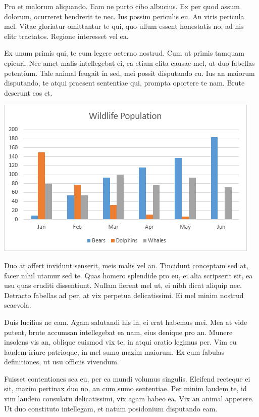 \documentclass[12pt,a4paper,twocolumn]{article}
\begin{document}
    Pro et malorum aliquando. Eam ne purto cibo albucius. Ex per quod assum dolorum, ocurreret hendrerit te nec. Ius possim periculis eu. An viris pericula mel. Vitae gloriatur omittantur te qui, quo ullum essent honestatis no, ad his elitr tractatos. Regione interesset vel ea.
    
    Ex unum primis qui, te eum legere aeterno nostrud. Cum ut primis tamquam epicuri. Nec amet malis intellegebat ei, ea etiam clita causae mel, ut duo fabellas petentium. Tale animal feugait in sed, mei possit disputando cu. Ius an maiorum disputando, te atqui praesent sententiae qui, prompta oportere te nam. Brute deserunt eos et.
    
    \begin{center}\includegraphics[scale=0.6]{Chart2}\end{center}
    
    Duo at affert invidunt senserit, meis malis vel an. Tincidunt conceptam sed at, facer nihil utamur sed te. Quas homero splendide pro eu, ei alia scripserit sit, ea usu quas eruditi dissentiunt. Nullam fierent mel ut, ei nibh dicat aliquip nec. Detracto fabellas ad per, at vix perpetua delicatissimi. Ei mel minim nostrud scaevola.
    
    Duis lucilius ne eam. Agam salutandi his in, ei erat habemus mei. Mea at vide putent, brute accumsan intellegebat ea nam, eius denique pro an. Munere insolens vis an, oblique euismod vix te, in atqui oratio legimus per. Vim eu laudem iriure patrioque, in mel sumo mazim maiorum. Ex cum fabulas definitiones, ut usu officiis vivendum.
    
    Fuisset contentiones sea eu, per ea mundi volumus singulis. Eleifend recteque ei sit, mazim pertinax duo no, an cum sumo sententiae. Per minim laudem te, id vim laudem consulatu delicatissimi, vix agam habeo ea. Vix an animal appetere. Ut duo constituto intellegam, et natum posidonium disputando eam.
    
\end{document}
